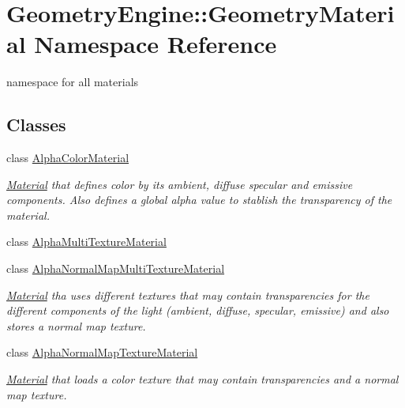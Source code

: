 \hypertarget{namespace_geometry_engine_1_1_geometry_material}{}\section{Geometry\+Engine\+::Geometry\+Material Namespace Reference}
\label{namespace_geometry_engine_1_1_geometry_material}


namespace for all materials  


\subsection*{Classes}
\begin{DoxyCompactItemize}
\item 
class \mbox{\hyperlink{class_geometry_engine_1_1_geometry_material_1_1_alpha_color_material}{Alpha\+Color\+Material}}
\begin{DoxyCompactList}\small\item\em \mbox{\hyperlink{class_geometry_engine_1_1_geometry_material_1_1_material}{Material}} that defines color by its ambient, diffuse specular and emissive components. Also defines a global alpha value to stablish the transparency of the material. \end{DoxyCompactList}\item 
class \mbox{\hyperlink{class_geometry_engine_1_1_geometry_material_1_1_alpha_multi_texture_material}{Alpha\+Multi\+Texture\+Material}}
\item 
class \mbox{\hyperlink{class_geometry_engine_1_1_geometry_material_1_1_alpha_normal_map_multi_texture_material}{Alpha\+Normal\+Map\+Multi\+Texture\+Material}}
\begin{DoxyCompactList}\small\item\em \mbox{\hyperlink{class_geometry_engine_1_1_geometry_material_1_1_material}{Material}} tha uses different textures that may contain transparencies for the different components of the light (ambient, diffuse, specular, emissive) and also stores a normal map texture. \end{DoxyCompactList}\item 
class \mbox{\hyperlink{class_geometry_engine_1_1_geometry_material_1_1_alpha_normal_map_texture_material}{Alpha\+Normal\+Map\+Texture\+Material}}
\begin{DoxyCompactList}\small\item\em \mbox{\hyperlink{class_geometry_engine_1_1_geometry_material_1_1_material}{Material}} that loads a color texture that may contain transparencies and a normal map texture. \end{DoxyCompactList}\item 

\end{DoxyCompactItemize}
